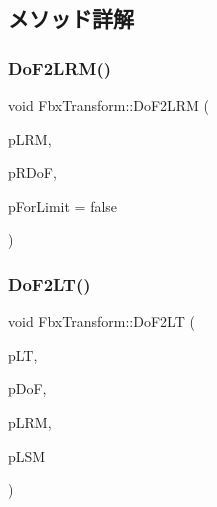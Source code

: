 \subsection{メソッド詳解}
\mbox{\label{class_fbx_transform_a847bede94ccc4f6376c25e9b891472e4}} 
\subsubsection{\texorpdfstring{Do\+F2\+L\+R\+M()}{DoF2LRM()}}
{\footnotesize\ttfamily void Fbx\+Transform\+::\+Do\+F2\+L\+RM (\begin{DoxyParamCaption}\item[{\hyperlink{class_fbx_a_matrix}{Fbx\+A\+Matrix} \&}]{p\+L\+RM,  }\item[{const \hyperlink{class_fbx_vector4}{Fbx\+Vector4} \&}]{p\+R\+DoF,  }\item[{bool}]{p\+For\+Limit = {\ttfamily false} }\end{DoxyParamCaption})}

\mbox{\label{class_fbx_transform_a37e9fe96d732d9231d8512529db452b0}} 
\subsubsection{\texorpdfstring{Do\+F2\+L\+T()}{DoF2LT()}}
{\footnotesize\ttfamily void Fbx\+Transform\+::\+Do\+F2\+LT (\begin{DoxyParamCaption}\item[{\hyperlink{class_fbx_vector4}{Fbx\+Vector4} \&}]{p\+LT,  }\item[{const \hyperlink{class_fbx_vector4}{Fbx\+Vector4} \&}]{p\+DoF,  }\item[{const \hyperlink{class_fbx_a_matrix}{Fbx\+A\+Matrix} \&}]{p\+L\+RM,  }\item[{const \hyperlink{class_fbx_a_matrix}{Fbx\+A\+Matrix} \&}]{p\+L\+SM }\end{DoxyParamCaption})}

\mbox{\label{class_fbx_transform_ad29a1e87720838947b5444937c9326ae}} 
